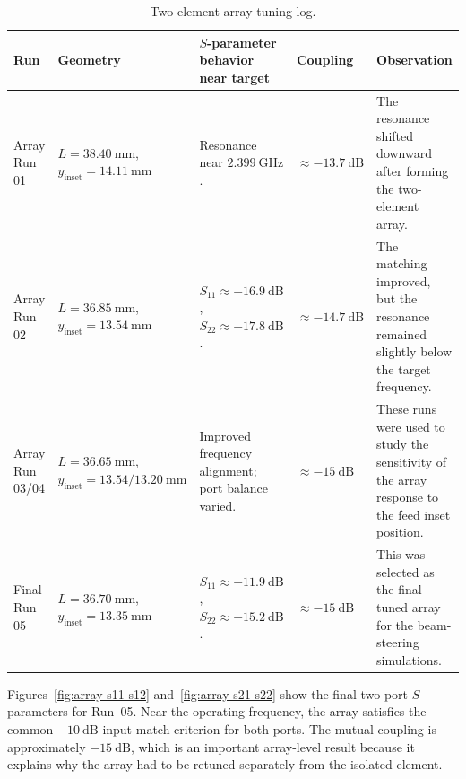 \begin{table}[H]
\centering
\caption{Two-element array tuning log.}
\label{tab:array-tuning-log}
\footnotesize
\setlength{\tabcolsep}{4pt}
\renewcommand{\arraystretch}{1.25}

\begin{tabularx}{\textwidth}{@{}
>{\raggedright\arraybackslash}p{}
>{\raggedright\arraybackslash}p{}
>{\raggedright\arraybackslash}p{}
>{\centering\arraybackslash}p{}
>{\raggedright\arraybackslash}X
@{}}
\toprule
\textbf{Run} &
\textbf{Geometry} &
\textbf{\(S\)-parameter behavior near target} &
\textbf{Coupling} &
\textbf{Observation} \\
\midrule

Array Run 01 &
\(L=38.40~\mathrm{mm}\), \(y_{\mathrm{inset}}=14.11~\mathrm{mm}\) &
Resonance near \(2.399~\mathrm{GHz}\). &
\(\approx -13.7~\mathrm{dB}\) &
The resonance shifted downward after forming the two-element array. \\

Array Run 02 &
\(L=36.85~\mathrm{mm}\), \(y_{\mathrm{inset}}=13.54~\mathrm{mm}\) &
\(S_{11}\approx -16.9~\mathrm{dB}\), \(S_{22}\approx -17.8~\mathrm{dB}\). &
\(\approx -14.7~\mathrm{dB}\) &
The matching improved, but the resonance remained slightly below the target frequency. \\

Array Run 03/04 &
\(L=36.65~\mathrm{mm}\), \(y_{\mathrm{inset}}=13.54/13.20~\mathrm{mm}\) &
Improved frequency alignment; port balance varied. &
\(\approx -15~\mathrm{dB}\) &
These runs were used to study the sensitivity of the array response to the feed inset position. \\

Final Run 05 &
\(L=36.70~\mathrm{mm}\), \(y_{\mathrm{inset}}=13.35~\mathrm{mm}\) &
\(S_{11}\approx -11.9~\mathrm{dB}\), \(S_{22}\approx -15.2~\mathrm{dB}\). &
\(\approx -15~\mathrm{dB}\) &
This was selected as the final tuned array for the beam-steering simulations. \\

\bottomrule
\end{tabularx}
\end{table}

Figures~\ref{fig:array-s11-s12} and~\ref{fig:array-s21-s22} show the final two-port
\(S\)-parameters for Run~05.  Near the operating frequency, the array satisfies the common
\(-10~\mathrm{dB}\) input-match criterion for both ports.  The mutual coupling is approximately
\(-15~\mathrm{dB}\), which is an important array-level result because it explains why the array had to
be retuned separately from the isolated element.

